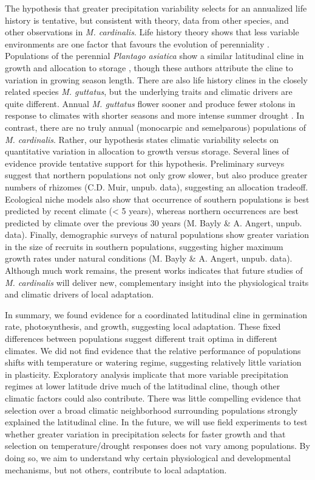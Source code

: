 \documentclass[11pt, oneside]{article}
\begin{document}
The hypothesis that greater precipitation variability selects for an annualized life history is tentative, but consistent with theory, data from other species, and other observations in \textit{M. cardinalis}. Life history theory shows that less variable environments are one factor that favours the evolution of perenniality \citep{Stearns_1976, Iwasa_Cohen_1989, Friedman_Rubin_2015}. Populations of the perennial \textit{Plantago asiatica} show a similar latitudinal cline in growth and allocation to storage \citep{Sawada_etal_1994}, though these authors attribute the cline to variation in growing season length. There are also life history clines in the closely related species \textit{M. guttatus}, but the underlying traits and climatic drivers are quite different. Annual \textit{M. guttatus} flower sooner and produce fewer stolons in response to climates with shorter seasons and more intense summer drought \citep{Lowry_Willis_2010, Friedman_etal_2015, Kooyers_etal_2015}. In contrast, there are no truly annual (monocarpic and semelparous) populations of \textit{M. cardinalis}. Rather, our hypothesis states climatic variability selects on quantitative variation in allocation to growth versus storage. Several lines of evidence provide tentative support for this hypothesis. Preliminary surveys suggest that northern populations not only grow slower, but also produce greater numbers of rhizomes (C.D. Muir, unpub. data), suggesting an allocation tradeoff. Ecological niche models also show that occurrence of southern populations is best predicted by recent climate (< 5 years), whereas northern occurrences are best predicted by climate over the previous 30 years (M. Bayly \& A. Angert, unpub. data). Finally, demographic surveys of natural populations show greater variation in the size of recruits in southern populations, suggesting higher maximum growth rates under natural conditions (M. Bayly \& A. Angert, unpub. data). Although much work remains, the present works indicates that future studies of \textit{M. cardinalis} will deliver new, complementary insight into the physiological traits and climatic drivers of local adaptation.

In summary, we found evidence for a coordinated latitudinal cline in germination rate, photosynthesis, and growth, suggesting local adaptation. These fixed differences between populations suggest different trait optima in different climates. We did not find evidence that the relative performance of populations shifts with temperature or watering regime, suggesting relatively little variation in plasticity. Exploratory analysis implicate that more variable precipitation regimes at lower latitude drive much of the latitudinal cline, though other climatic factors could also contribute. There was little compelling evidence that selection over a broad climatic neighborhood surrounding populations strongly explained the latitudinal cline. In the future, we will use field experiments to test whether greater variation in precipitation selects for faster growth and that selection on temperature/drought responses does not vary among populations. By doing so, we aim to understand why certain physiological and developmental mechanisms, but not others, contribute to local adaptation.
\end{document}
